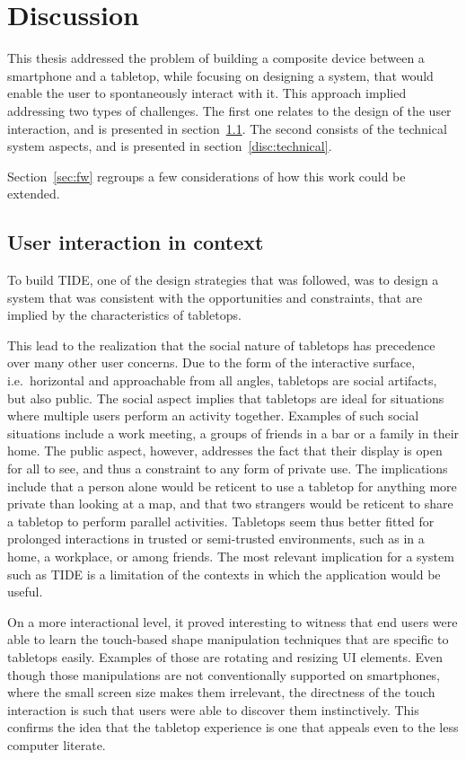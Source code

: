 \chapter{Discussion}
\label{discussion}

This thesis addressed the problem of building a composite device between a smartphone and a tabletop, while focusing on designing a system, that would enable the user to spontaneously interact with it.
This approach implied addressing two types of challenges.
The first one relates to the design of the user interaction, and is presented in section~\ref{disc:ui}.
The second consists of the technical system aspects, and is presented in section~\ref{disc:technical}.

Section~\ref{sec:fw} regroups a few considerations of how this work could be extended.

\section{User interaction in context}
\label{disc:ui}

To build TIDE, one of the design strategies that was followed, was to design a system that was consistent with the opportunities and constraints, that are implied by the characteristics of tabletops.

This lead to the realization that the social nature of tabletops has precedence over many other user concerns.
Due to the form of the interactive surface, i.e.\ horizontal and approachable from all angles, tabletops are social artifacts,  but also public.
The social aspect implies that tabletops are ideal for situations where multiple users perform an activity together.
Examples of such social situations include a work meeting, a groups of friends in a bar or a family in their home.
The public aspect, however, addresses the fact that their display is open for all to see, and thus a constraint to any form of private use.
The implications include that a person alone would be reticent to use a tabletop for anything more private than looking at a map, and that two strangers would be reticent to share a tabletop to perform parallel activities.
Tabletops seem thus better fitted for prolonged interactions in trusted or semi-trusted environments, such as in a home, a workplace, or among friends.
The most relevant implication for a system such as TIDE is a limitation of the contexts in which the application would be useful.

On a more interactional level, it proved interesting to witness that end users were able to learn the touch-based shape manipulation techniques that are specific to tabletops easily.
Examples of those are rotating and resizing UI elements.
Even though those manipulations are not conventionally supported on smartphones, where the small screen size makes them irrelevant, the directness of the touch interaction is such that users were able to discover them instinctively.
This confirms the idea that the tabletop experience is one that appeals even to the less computer literate.

